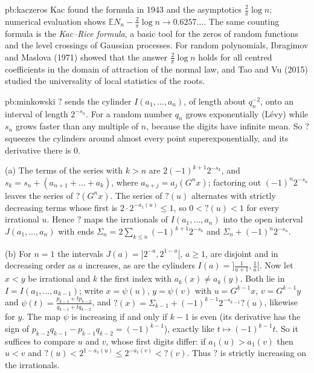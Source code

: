\begin{solution}{pb:kaczeros}
\leads Kac found the formula in 1943 and the asymptotics $\frac2\pi\log n$; numerical evaluation shows $\mathbb EN_n-\frac2\pi\log n\to0.6257\ldots$. The same counting formula is the
\emph{Kac--Rice formula}, a basic tool for the zeros of random functions and the level crossings of Gaussian processes. For random polynomials, Ibragimov and Maslova (1971)
showed that the answer $\frac2\pi\log n$ holds for all centred coefficients in the domain of attraction of the normal law, and Tao and Vu (2015) studied the universality of
local statistics of the roots.
\end{solution}

\begin{solution}{pb:minkowski}
\idea $?$ sends the cylinder $I(a_1,\dots,a_n)$, of length about $q_n^{-2}$, onto an interval of length $2^{-s_n}$. For a random number $q_n$ grows exponentially
(Lévy) while $s_n$ grows faster than any multiple of $n$, because the digits have infinite mean. So $?$ squeezes the cylinders around almost every point
superexponentially, and its derivative there is $0$.

\writeup (a) The terms of the series with $k>n$ are $2(-1)^{k+1}2^{-s_k}$, and $s_k=s_n+(a_{n+1}+\dots+a_k)$, where $a_{n+j}=a_j(G^nx)$; factoring out
$(-1)^n2^{-s_n}$ leaves the series of $?(G^nx)$. The series of $?(u)$ alternates with strictly decreasing terms whose first is $2\cdot2^{-a_1(u)}\le1$, so
$0<?(u)<1$ for every irrational $u$. Hence $?$ maps the irrationals of $I(a_1,\dots,a_n)$ into the open interval $J(a_1,\dots,a_n)$ with ends
$\Sigma_n=2\sum_{k\le n}(-1)^{k+1}2^{-s_k}$ and $\Sigma_n+(-1)^n2^{-s_n}$.

(b) For $n=1$ the intervals $J(a)=]2^{-a},2^{1-a}[$, $a\ge1$, are disjoint and in decreasing order as $a$ increases, as are the cylinders $I(a)=]\frac1{a+1},\frac1a[$.
Now let $x<y$ be irrational and $k$ the first index with $a_k(x)\ne a_k(y)$. Both lie in $I=I(a_1,\dots,a_{k-1})$; write $x=\psi(u)$, $y=\psi(v)$ with $u=G^{k-1}x$,
$v=G^{k-1}y$ and $\psi(t)=\frac{p_{k-1}+tp_{k-2}}{q_{k-1}+tq_{k-2}}$, and $?(x)=\Sigma_{k-1}+(-1)^{k-1}2^{-s_{k-1}}?(u)$, likewise for $y$. The map $\psi$ is increasing
if and only if $k-1$ is even (its derivative has the sign of $p_{k-2}q_{k-1}-p_{k-1}q_{k-2}=(-1)^{k-1}$), exactly like $t\mapsto(-1)^{k-1}t$. So it suffices to compare
$u$ and $v$, whose first digits differ: if $a_1(u)>a_1(v)$ then $u<v$ and $?(u)<2^{1-a_1(u)}\le2^{-a_1(v)}<?(v)$. Thus $?$ is strictly increasing on the irrationals.


\end{solution}
